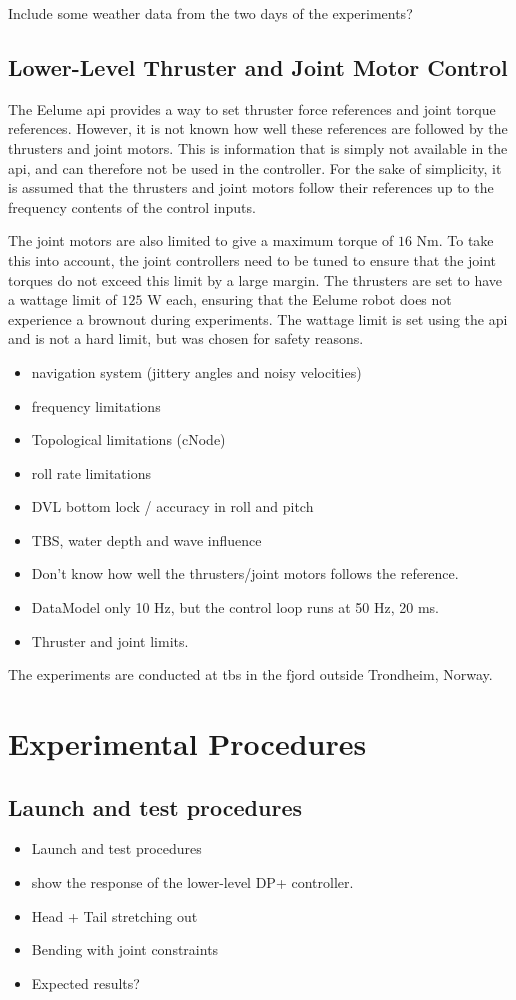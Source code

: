 {
    \color{red}
    Include some weather data from the two days of the experiments?
}

\subsection*{Lower-Level Thruster and Joint Motor Control}
The Eelume \gls{api} provides a way to set thruster force references and joint
torque references. However, it is not known how well these references are
followed by the thrusters and joint motors. This is information that is simply
not available in the \gls{api}, and can therefore not be used in the controller.
For the sake of simplicity, it is assumed that the thrusters and joint motors
follow their references up to the frequency contents of the control inputs.

The joint motors are also limited to give a maximum torque of \(16\) Nm. To take
this into account, the joint controllers need to be tuned to ensure that the
joint torques do not exceed this limit by a large margin. The thrusters are set
to have a wattage limit of \(125\) W each, ensuring that the Eelume robot does
not experience a brownout during experiments. The wattage limit is set using the
\gls{api} and is not a hard limit, but was chosen for safety reasons.



\begin{itemize}
    \item navigation system (jittery angles and noisy velocities)
    \item frequency limitations
    \item Topological limitations (cNode)
    \item roll rate limitations
    \item DVL bottom lock / accuracy in roll and pitch
    \item TBS, water depth and wave influence
    \item Don't know how well the thrusters/joint motors follows the reference.
    \item DataModel only 10 Hz, but the control loop runs at 50 Hz, 20 ms.
    \item Thruster and joint limits.
\end{itemize}

The experiments are conducted at \gls{tbs} in the fjord outside Trondheim, Norway.
\section{Experimental Procedures}
\subsection*{Launch and test procedures}
\begin{itemize}
    \item Launch and test procedures
    \item show the response of the lower-level DP+ controller.
    \item Head + Tail stretching out
    \item Bending with joint constraints
    \item Expected results?
\end{itemize}


